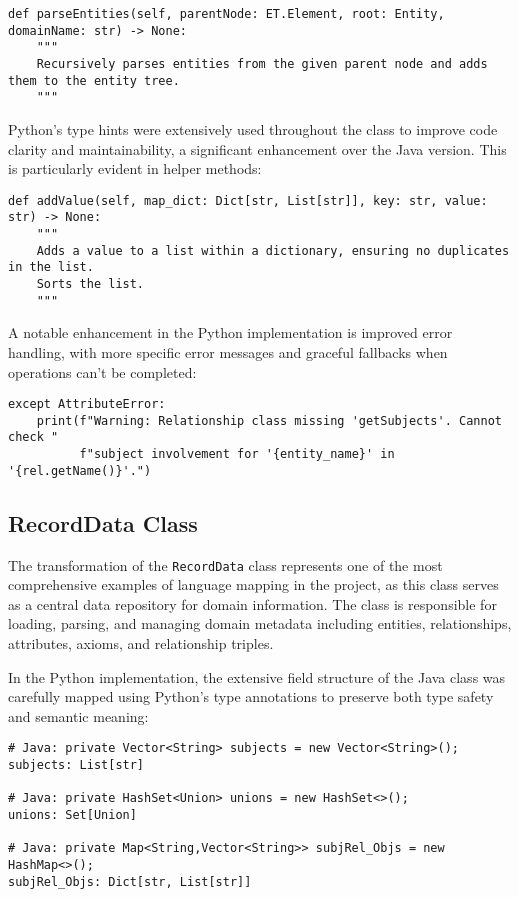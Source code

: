 \documentclass[12pt,a4paper]{article}
\begin{document}
\begin{verbatim}
def parseEntities(self, parentNode: ET.Element, root: Entity, domainName: str) -> None:
    """
    Recursively parses entities from the given parent node and adds them to the entity tree.
    """
\end{verbatim}

Python's type hints were extensively used throughout the class to improve code clarity and maintainability, a significant enhancement over the Java version. This is particularly evident in helper methods:

\begin{verbatim}
def addValue(self, map_dict: Dict[str, List[str]], key: str, value: str) -> None:
    """
    Adds a value to a list within a dictionary, ensuring no duplicates in the list.
    Sorts the list.
    """
\end{verbatim}

A notable enhancement in the Python implementation is improved error handling, with more specific error messages and graceful fallbacks when operations can't be completed:

\begin{verbatim}
except AttributeError:
    print(f"Warning: Relationship class missing 'getSubjects'. Cannot check "
          f"subject involvement for '{entity_name}' in '{rel.getName()}'.")
\end{verbatim}

\subsection{RecordData Class}

The transformation of the \texttt{RecordData} class represents one of the most comprehensive examples of language mapping in the project, as this class serves as a central data repository for domain information. The class is responsible for loading, parsing, and managing domain metadata including entities, relationships, attributes, axioms, and relationship triples.

In the Python implementation, the extensive field structure of the Java class was carefully mapped using Python's type annotations to preserve both type safety and semantic meaning:

\begin{verbatim}
# Java: private Vector<String> subjects = new Vector<String>();
subjects: List[str]

# Java: private HashSet<Union> unions = new HashSet<>();
unions: Set[Union]

# Java: private Map<String,Vector<String>> subjRel_Objs = new HashMap<>();
subjRel_Objs: Dict[str, List[str]]
\end{verbatim}
\end{document}
